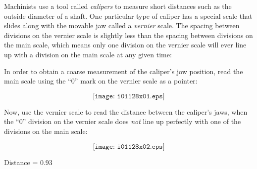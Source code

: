 

Machinists use a tool called {\it calipers} to measure short distances such as the outside diameter of a shaft.  One particular type of caliper has a special scale that slides along with the movable jaw called a {\it vernier} scale.  The spacing between divisions on the vernier scale is slightly less than the spacing between divisions on the main scale, which means only one division on the vernier scale will ever line up with a division on the main scale at any given time:

In order to obtain a coarse measurement of the caliper's jow position, read the main scale using the ``0'' mark on the vernier scale as a pointer:

$$\texttt{[image: i01128x01.eps]}$$

\filbreak

Now, use the vernier scale to read the distance between the caliper's jaws, when the ``0'' division on the vernier scale does {\it not} line up perfectly with one of the divisions on the main scale:

$$\texttt{[image: i01128x02.eps]}$$







Distance = 0.93
 










